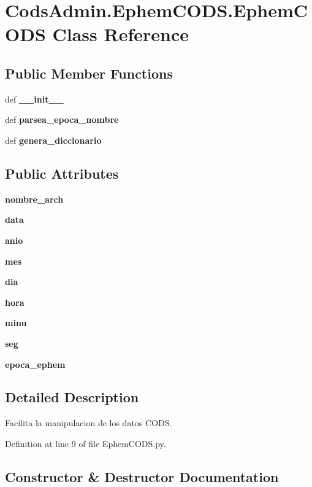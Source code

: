 \section{\-Cods\-Admin.\-Ephem\-C\-O\-D\-S.\-Ephem\-C\-O\-D\-S \-Class \-Reference}
\label{class_cods_admin_1_1_ephem_c_o_d_s_1_1_ephem_c_o_d_s}
\subsection*{\-Public \-Member \-Functions}
\begin{DoxyCompactItemize}
\item 
def {\bf \-\_\-\-\_\-init\-\_\-\-\_\-}
\item 
def {\bf parsea\-\_\-epoca\-\_\-nombre}
\item 
def {\bf genera\-\_\-diccionario}
\end{DoxyCompactItemize}
\subsection*{\-Public \-Attributes}
\begin{DoxyCompactItemize}
\item 
{\bf nombre\-\_\-arch}
\item 
{\bf data}
\item 
{\bf anio}
\item 
{\bf mes}
\item 
{\bf dia}
\item 
{\bf hora}
\item 
{\bf minu}
\item 
{\bf seg}
\item 
{\bf epoca\-\_\-ephem}
\end{DoxyCompactItemize}


\subsection{\-Detailed \-Description}
\begin{DoxyVerb}
Facilita la manipulacion de los datos CODS.
\end{DoxyVerb}
 

\-Definition at line 9 of file \-Ephem\-C\-O\-D\-S.\-py.



\subsection{\-Constructor \& \-Destructor \-Documentation}
